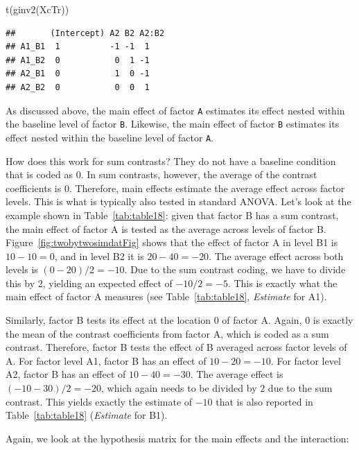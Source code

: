 \documentclass[
  12pt,
]{krantz}
\newenvironment{Shaded}{\begin{snugshade}}{\end{snugshade}}
\newcommand{\FunctionTok}[1]{\textcolor[rgb]{0.00,0.00,0.00}{#1}}
\newcommand{\NormalTok}[1]{#1}
\theoremstyle{definition}
\theoremstyle{definition}
\theoremstyle{definition}
\theoremstyle{definition}
\theoremstyle{remark}
\begin{document}
\begin{Shaded}
\begin{Highlighting}[]
\FunctionTok{t}\NormalTok{(}\FunctionTok{ginv2}\NormalTok{(XcTr))}
\end{Highlighting}
\end{Shaded}

\begin{verbatim}
##       (Intercept) A2 B2 A2:B2
## A1_B1  1          -1 -1  1   
## A1_B2  0           0  1 -1   
## A2_B1  0           1  0 -1   
## A2_B2  0           0  0  1
\end{verbatim}

As discussed above, the main effect of factor \texttt{A} estimates its effect nested within the baseline level of factor \texttt{B}. Likewise, the main effect of factor \texttt{B} estimates its effect nested within the baseline level of factor \texttt{A}.

How does this work for sum contrasts? They do not have a baseline condition that is coded as \(0\). In sum contrasts, however, the average of the contrast coefficients is \(0\). Therefore, main effects estimate the average effect across factor levels. This is what is typically also tested in standard ANOVA. Let's look at the example shown in Table~\ref{tab:table18}: given that factor B has a sum contrast, the main effect of factor A is tested as the average across levels of factor B. Figure~\ref{fig:twobytwosimdatFig} shows that the effect of factor A in level B1 is \(10 - 10 = 0\), and in level B2 it is \(20 - 40 = -20\). The average effect across both levels is \((0 - 20)/2 = -10\). Due to the sum contrast coding, we have to divide this by 2, yielding an expected effect of \(-10 / 2 = -5\). This is exactly what the main effect of factor A measures (see Table~\ref{tab:table18}, \emph{Estimate} for A1).

Similarly, factor B tests its effect at the location \(0\) of factor A. Again, \(0\) is exactly the mean of the contrast coefficients from factor A, which is coded as a sum contrast. Therefore, factor B tests the effect of B averaged across factor levels of A. For factor level A1, factor B has an effect of \(10 - 20 = -10\). For factor level A2, factor B has an effect of \(10 - 40 = -30\). The average effect is \((-10 - 30)/2 = -20\), which again needs to be divided by \(2\) due to the sum contrast. This yields exactly the estimate of \(-10\) that is also reported in Table~\ref{tab:table18} (\emph{Estimate} for B1).

Again, we look at the hypothesis matrix for the main effects and the interaction:
\end{document}

